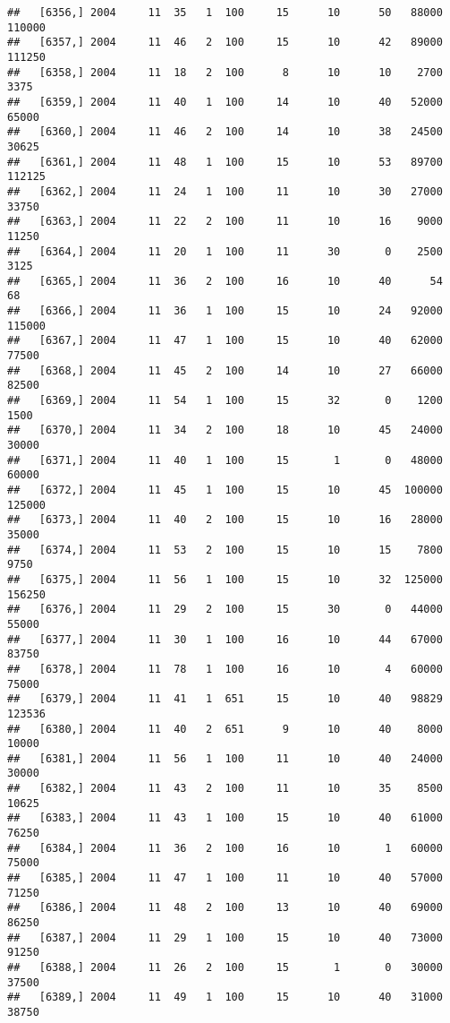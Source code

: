 \documentclass{article}\usepackage[]{graphicx}\usepackage[]{color}
\makeatletter
\newenvironment{kframe}{%
 \def\at@end@of@kframe{}%
 \ifinner\ifhmode%
  \def\at@end@of@kframe{\end{minipage}}%
  \begin{minipage}{\columnwidth}%
 \fi\fi%
 \def\FrameCommand##1{\hskip\@totalleftmargin \hskip-\fboxsep
 \colorbox{shadecolor}{##1}\hskip-\fboxsep
     \hskip-\linewidth \hskip-\@totalleftmargin \hskip\columnwidth}%
 \MakeFramed {\advance\hsize-\width
   \@totalleftmargin\z@ \linewidth\hsize
   \@setminipage}}%
 {\par\unskip\endMakeFramed%
 \at@end@of@kframe}
\newenvironment{knitrout}{}{} %
\makeatother
\begin{document}
\begin{knitrout}
\begin{kframe}
\begin{verbatim}
##   [6356,] 2004     11  35   1  100     15      10      50   88000  110000
##   [6357,] 2004     11  46   2  100     15      10      42   89000  111250
##   [6358,] 2004     11  18   2  100      8      10      10    2700    3375
##   [6359,] 2004     11  40   1  100     14      10      40   52000   65000
##   [6360,] 2004     11  46   2  100     14      10      38   24500   30625
##   [6361,] 2004     11  48   1  100     15      10      53   89700  112125
##   [6362,] 2004     11  24   1  100     11      10      30   27000   33750
##   [6363,] 2004     11  22   2  100     11      10      16    9000   11250
##   [6364,] 2004     11  20   1  100     11      30       0    2500    3125
##   [6365,] 2004     11  36   2  100     16      10      40      54      68
##   [6366,] 2004     11  36   1  100     15      10      24   92000  115000
##   [6367,] 2004     11  47   1  100     15      10      40   62000   77500
##   [6368,] 2004     11  45   2  100     14      10      27   66000   82500
##   [6369,] 2004     11  54   1  100     15      32       0    1200    1500
##   [6370,] 2004     11  34   2  100     18      10      45   24000   30000
##   [6371,] 2004     11  40   1  100     15       1       0   48000   60000
##   [6372,] 2004     11  45   1  100     15      10      45  100000  125000
##   [6373,] 2004     11  40   2  100     15      10      16   28000   35000
##   [6374,] 2004     11  53   2  100     15      10      15    7800    9750
##   [6375,] 2004     11  56   1  100     15      10      32  125000  156250
##   [6376,] 2004     11  29   2  100     15      30       0   44000   55000
##   [6377,] 2004     11  30   1  100     16      10      44   67000   83750
##   [6378,] 2004     11  78   1  100     16      10       4   60000   75000
##   [6379,] 2004     11  41   1  651     15      10      40   98829  123536
##   [6380,] 2004     11  40   2  651      9      10      40    8000   10000
##   [6381,] 2004     11  56   1  100     11      10      40   24000   30000
##   [6382,] 2004     11  43   2  100     11      10      35    8500   10625
##   [6383,] 2004     11  43   1  100     15      10      40   61000   76250
##   [6384,] 2004     11  36   2  100     16      10       1   60000   75000
##   [6385,] 2004     11  47   1  100     11      10      40   57000   71250
##   [6386,] 2004     11  48   2  100     13      10      40   69000   86250
##   [6387,] 2004     11  29   1  100     15      10      40   73000   91250
##   [6388,] 2004     11  26   2  100     15       1       0   30000   37500
##   [6389,] 2004     11  49   1  100     15      10      40   31000   38750

\end{verbatim}
\end{kframe}
\end{knitrout}
\end{document}
